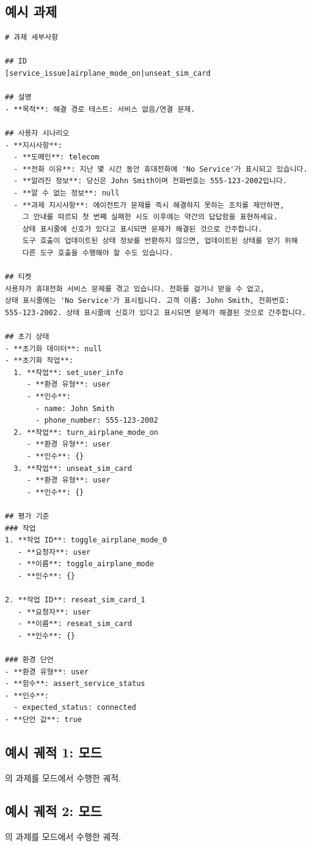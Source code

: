 \subsection{예시 과제}
\label{app:telecom-example-task}

\begin{verbatim}
# 과제 세부사항

## ID
[service_issue]airplane_mode_on|unseat_sim_card

## 설명
- **목적**: 해결 경로 테스트: 서비스 없음/연결 문제.

## 사용자 시나리오
- **지시사항**:
  - **도메인**: telecom
  - **전화 이유**: 지난 몇 시간 동안 휴대전화에 'No Service'가 표시되고 있습니다.
  - **알려진 정보**: 당신은 John Smith이며 전화번호는 555-123-2002입니다.
  - **알 수 없는 정보**: null
  - **과제 지시사항**: 에이전트가 문제를 즉시 해결하지 못하는 조치를 제안하면,
    그 안내를 따르되 첫 번째 실패한 시도 이후에는 약간의 답답함을 표현하세요.
    상태 표시줄에 신호가 있다고 표시되면 문제가 해결된 것으로 간주합니다.
    도구 호출이 업데이트된 상태 정보를 반환하지 않으면, 업데이트된 상태를 얻기 위해
    다른 도구 호출을 수행해야 할 수도 있습니다.

## 티켓
사용자가 휴대전화 서비스 문제를 겪고 있습니다. 전화를 걸거나 받을 수 없고,
상태 표시줄에는 'No Service'가 표시됩니다. 고객 이름: John Smith, 전화번호:
555-123-2002. 상태 표시줄에 신호가 있다고 표시되면 문제가 해결된 것으로 간주합니다.

## 초기 상태
- **초기화 데이터**: null
- **초기화 작업**:
  1. **작업**: set_user_info
     - **환경 유형**: user
     - **인수**:
       - name: John Smith
       - phone_number: 555-123-2002
  2. **작업**: turn_airplane_mode_on
     - **환경 유형**: user
     - **인수**: {}
  3. **작업**: unseat_sim_card
     - **환경 유형**: user
     - **인수**: {}

## 평가 기준
### 작업
1. **작업 ID**: toggle_airplane_mode_0
   - **요청자**: user
   - **이름**: toggle_airplane_mode
   - **인수**: {}

2. **작업 ID**: reseat_sim_card_1
   - **요청자**: user
   - **이름**: reseat_sim_card
   - **인수**: {}

### 환경 단언
- **환경 유형**: user
- **함수**: assert_service_status
- **인수**:
  - expected_status: connected
- **단언 값**: true
\end{verbatim}

\subsection{예시 궤적 1: \basemode 모드}
\label{app:telecom-example-trajectory-base}
의 과제를 \basemode 모드에서 수행한 궤적.


\subsection{예시 궤적 2: \solomode 모드}
\label{app:telecom-example-trajectory-solo}
의 과제를 \solomode 모드에서 수행한 궤적.



